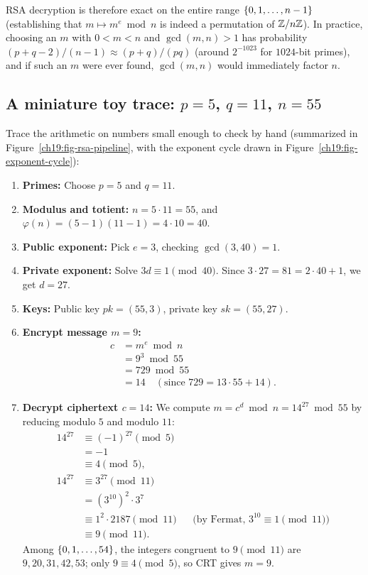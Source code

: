 RSA decryption is therefore exact on the entire range $\{0,1,\dots,n-1\}$ (establishing that $m \mapsto m^e \bmod n$ is indeed a permutation of $\mathbb{Z}/n\mathbb{Z}$). In practice, choosing an $m$ with $0 < m < n$ and $\gcd(m,n) > 1$ has probability $(p + q - 2)/(n - 1) \approx (p+q)/(pq)$ (around $2^{-1023}$ for $1024$-bit primes), and if such an $m$ were ever found, $\gcd(m,n)$ would immediately factor $n$.

\subsection{A miniature toy trace: \texorpdfstring{$p=5$, $q=11$, $n=55$}{p=5, q=11, n=55}}
\label{ch19:mini-toy}

Trace the arithmetic on numbers small enough to check by hand (summarized in Figure~\ref{ch19:fig-rsa-pipeline}, with the exponent cycle drawn in Figure~\ref{ch19:fig-exponent-cycle}):
\begin{enumerate}
  \item \textbf{Primes:} Choose $p = 5$ and $q = 11$.
  \item \textbf{Modulus and totient:} $n = 5 \cdot 11 = 55$, and $\varphi(n) = (5-1)(11-1) = 4 \cdot 10 = 40$.
  \item \textbf{Public exponent:} Pick $e = 3$, checking $\gcd(3, 40) = 1$.
  \item \textbf{Private exponent:} Solve $3d \equiv 1 \pmod{40}$. Since $3 \cdot 27 = 81 = 2 \cdot 40 + 1$, we get $d = 27$.
  \item \textbf{Keys:} Public key $pk = (55, 3)$, private key $sk = (55, 27)$.
  \item \textbf{Encrypt message $m = 9$:}
  \begin{align*}
    c &= m^e \bmod n \\
      &= 9^3 \bmod 55 \\
      &= 729 \bmod 55 \\
      &= 14 \quad (\text{since } 729 = 13 \cdot 55 + 14).
  \end{align*}
  \item \textbf{Decrypt ciphertext $c = 14$:} We compute $m = c^d \bmod n = 14^{27} \bmod 55$ by reducing modulo $5$ and modulo $11$:
  \begin{align*}
    14^{27} &\equiv (-1)^{27} \pmod 5 \\
            &= -1 \\
            &\equiv 4 \pmod 5, \\[1ex]
    14^{27} &\equiv 3^{27} \pmod{11} \\
            &= (3^{10})^2 \cdot 3^7 \\
            &\equiv 1^2 \cdot 2187 \pmod{11} &&\text{(by Fermat, $3^{10}\equiv 1 \pmod{11}$)} \\
            &\equiv 9 \pmod{11}.
  \end{align*}
  Among $\{0, 1, \dots, 54\}$, the integers congruent to $9 \pmod{11}$ are $9, 20, 31, 42, 53$; only $9 \equiv 4 \pmod 5$, so CRT gives $m = 9$.
\end{enumerate}

